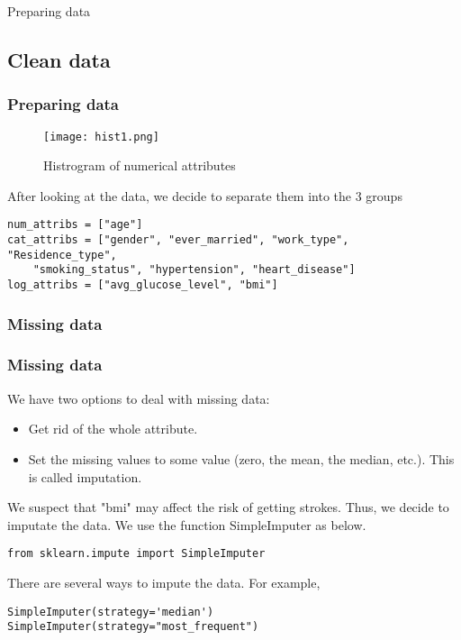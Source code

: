 \documentclass[10pt]{beamer}
\theoremstyle{definition}
\theoremstyle{remark}
\numberwithin{equation}{section}
\begin{document}
\begin{frame}
	\centering \large Preparing data
\end{frame}
\subsection{Clean data}

\begin{frame}[fragile]
	\frametitle{Preparing data}

		
		\begin{figure}[h]
			\caption{Histrogram of numerical attributes }
			\centering
			\texttt{[image: hist1.png]}
		\end{figure}
		

	
After looking at the data, we decide to separate them into the $3$ groups 
		\begin{lstlisting}
num_attribs = ["age"]
cat_attribs = ["gender", "ever_married", "work_type", "Residence_type", 
	"smoking_status", "hypertension", "heart_disease"]
log_attribs = ["avg_glucose_level", "bmi"]
		\end{lstlisting}
\end{frame}

\subsubsection{Missing data}
\begin{frame}[fragile]
	\frametitle{Missing data }
We have two options to deal with missing data:
\begin{itemize}
	\item Get rid of the whole attribute.
	\item  Set the missing values to some value (zero, the mean, the median, etc.). This is called imputation.
\end{itemize}

We suspect that "bmi" may affect the risk of getting strokes. Thus, we decide to imputate the data.
We use the function SimpleImputer as below.
\begin{lstlisting}
from sklearn.impute import SimpleImputer 
\end{lstlisting}
There are several ways to impute the data. For example,

\begin{lstlisting}
SimpleImputer(strategy='median')
SimpleImputer(strategy="most_frequent")
\end{lstlisting} 
\end{frame}
\end{document}
